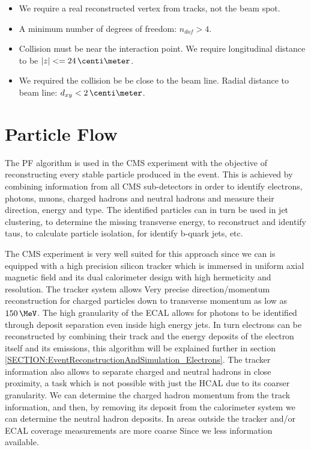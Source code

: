 \begin{itemize}
  \item We require a real reconstructed vertex from tracks, not the beam spot.
  \item A minimum number of degrees of freedom: $n_{dof}>4$.
  \item Collision must be near the interaction point. We require longitudinal distance to be $|z|<=24\,\centi\meter$.
  \item We required the collision be be close to the beam line. Radial distance to beam line: $d_{xy}<2\,\centi\meter$. 
\end{itemize}

\section{Particle Flow}
\label{SECTION:EventReconstructionAndSimulation_ParticleFlow}


The \gls{PF} algorithm \cite{ARTICLE:CMSComissioningOfParticleFlow, ARTICLE:CMSParticleFlowEventRecontruction, ARTICLE:CMSComissioningOfParticleFlowWithMinBias} is used in the \gls{CMS} experiment with the objective of reconstructing every stable particle produced in the event. This is achieved by combining information from all \gls{CMS} sub-detectors in order to identify electrons, photons, muons, charged hadrons and neutral hadrons and measure their direction, energy and type. The identified particles can in turn be used in jet clustering, to determine the missing transverse energy, to reconstruct and identify taus, to calculate particle isolation, for identify b-quark jets, etc.

The \gls{CMS} experiment is very well suited for this approach since we can is equipped with a high precision silicon tracker which is immersed in uniform axial magnetic field and its dual calorimeter design with high hermeticity and resolution. The tracker system allows Very precise direction/momentum reconstruction for charged particles down to transverse momentum as low as $150\,\MeV$. The high granularity of the \gls{ECAL} allows for photons to be identified through deposit separation even inside high energy jets. In turn electrons can be reconstructed by combining their track and the energy deposits of the electron itself and its emissions, this algorithm will be explained further in section \ref{SECTION:EventReconstructionAndSimulation_Electrons}. The tracker information also allows to separate charged and neutral hadrons in close proximity, a task which is not possible with just the \gls{HCAL} due to its coarser granularity. We can determine the charged hadron momentum from the track information, and then, by removing its deposit from the calorimeter system we can determine the neutral hadron deposits. In areas outside the tracker and/or \gls{ECAL} coverage measurements are more coarse Since we less information available.

